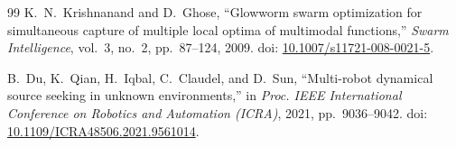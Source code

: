 \documentclass[11pt]{article}
\begin{document}
\begin{thebibliography}{99}
K.~N.~Krishnanand and D.~Ghose,
``Glowworm swarm optimization for simultaneous capture of multiple local optima of multimodal functions,''
\emph{Swarm Intelligence}, vol.~3, no.~2, pp.~87--124, 2009.
doi: \href{https://doi.org/10.1007/s11721-008-0021-5}{10.1007/s11721-008-0021-5}.

B.~Du, K.~Qian, H.~Iqbal, C.~Claudel, and D.~Sun,
``Multi-robot dynamical source seeking in unknown environments,''
in \emph{Proc. IEEE International Conference on Robotics and Automation (ICRA)}, 2021, pp.~9036--9042.
doi: \href{https://doi.org/10.1109/ICRA48506.2021.9561014}{10.1109/ICRA48506.2021.9561014}.

\end{thebibliography}
\end{document}
